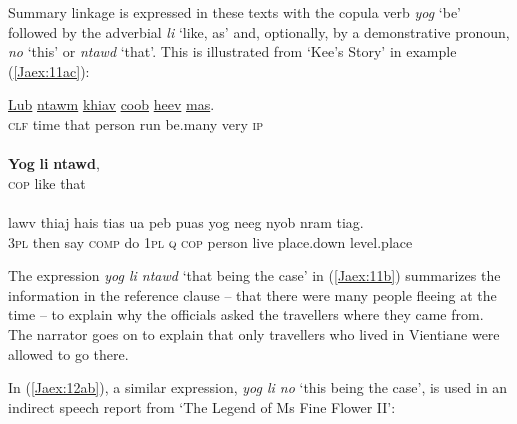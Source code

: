 \documentclass[output=paper]{LSP/langsci}
\begin{document}
Summary linkage is expressed in these texts with the copula verb \textit{yog } `be' followed by the adverbial \textit{li } `like, as' and, optionally, by a demonstrative pronoun, \textit{no} `this' or \textit{ntawd } `that'. This is illustrated from `Kee’s Story' in example (\ref{Jaex:11ac}):
 
\begin{exe}
\ex \label{Jaex:11ac}
\begin{xlist}
\ex \label{Jaex:11a}
\gll \underline{Lub} \underline{} \underline{ntawm} \underline{} \underline{khiav} \underline{coob}     \underline{heev} \underline{mas}.        \\
\textsc{clf} time that person run be.many very \textsc{ip}\\
\glt {}\\
\ex \label{Jaex:11b}
\gll   \textbf{Yog} \textbf{li} \textbf{ntawd},\\
\textsc{cop} like that\\
\glt {}\\
\ex \label{Jaex:11c}
\gll lawv  thiaj hais tias ua  peb puas yog neeg nyob nram   tiag.\\     	      
     3\textsc{pl} then say \textsc{comp} do 1\textsc{pl} \textsc{q} \textsc{cop} person live place.down level.place\\
\glt {} \citep[][227]{fuller85}
\end{xlist}
\end{exe}

\noindent
The expression \textit{yog li ntawd} `that being the case' in (\ref{Jaex:11b}) summarizes the information in the reference clause – that there were many people fleeing at the time – to explain why the officials asked the travellers where they came from. The narrator goes on to explain that only travellers who lived in Vientiane were allowed to go there.
 
In (\ref{Jaex:12ab}), a similar expression, \textit{yog li no} `this being the case', is used in an indirect speech report from `The Legend of Ms Fine Flower II':
 
\end{document}
